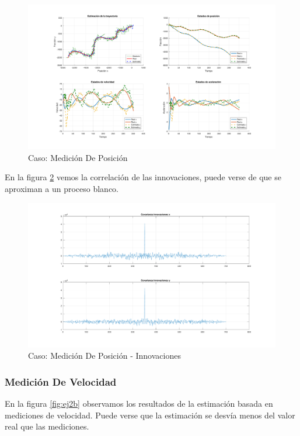 		\begin{figure}[H]
			\centering
			\includegraphics[width=1.0\textwidth,keepaspectratio]{Figuras/graf_ej2a.pdf}
			\caption{Caso: Medición De Posición}
			\label{fig:ej2a}
		\end{figure}
		
		En la figura \ref{fig:ej2a_innov} vemos la correlación de las innovaciones, puede verse de que se aproximan a un proceso blanco.
		
		\begin{figure}[H]
			\centering
			\includegraphics[width=1.0\textwidth,keepaspectratio]{Figuras/covinn_ej2a.pdf}
			\caption{Caso: Medición De Posición - Innovaciones}
			\label{fig:ej2a_innov}
		\end{figure}
		
		\subsubsection{Medición De Velocidad}
		
		En la figura \ref{fig:ej2b} observamos los resultados de la estimación basada en mediciones de velocidad. Puede verse que la estimación se desvía menos del valor real que las mediciones.
		
